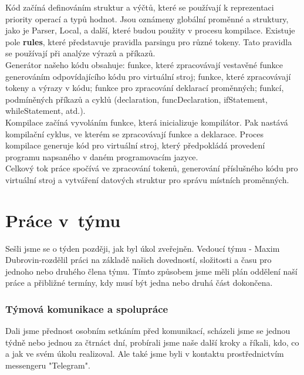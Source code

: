 \documentclass[a4paper, 11pt]{article}
\begin{document}
        Kód začíná definováním struktur a výčtů, které se používají k reprezentaci priority operací a typů hodnot.
        Jsou oznámeny globální proměnné a struktury, jako je Parser, Local, a další, které budou použity v procesu kompilace. Existuje pole \textbf{rules}, které představuje pravidla parsingu pro různé tokeny. Tato pravidla se používají při analýze výrazů a příkazů.\\
        Generátor našeho kódu obsahuje: funkce, které zpracovávají vestavěné funkce generováním odpovídajícího kódu pro virtuální stroj; funkce, které zpracovávají tokeny a výrazy v kódu; funkce pro zpracování deklarací proměnných; funkcí, podmíněných příkazů a cyklů (declaration, funcDeclaration, ifStatement, whileStatement, atd.).\\
        Kompilace začíná vyvoláním funkce, která inicializuje kompilátor. Pak nastává kompilační cyklus, ve kterém se zpracovávají funkce a deklarace.
        Proces kompilace generuje kód pro virtuální stroj, který předpokládá provedení programu napsaného v daném programovacím jazyce.\\

        
        Celkový tok práce spočívá ve zpracování tokenů, generování příslušného kódu pro virtuální stroj a vytváření datových struktur pro správu místních proměnných.


	\section{Práce v~týmu}

        Sešli jsme se o týden později, jak byl úkol zveřejněn. Vedoucí týmu - Maxim Dubrovin-rozdělil práci na základě našich dovedností, složitosti a času pro jednoho nebo druhého člena týmu. Tímto způsobem jsme měli plán oddělení naší práce a přibližné termíny, kdy musí být jedna nebo druhá část dokončena.

	\subsubsection{Týmová komunikace a spolupráce}

        Dali jsme přednost osobním setkáním před komunikací, scházeli jsme se jednou týdně nebo jednou za čtrnáct dní, probírali jsme naše další kroky a říkali, kdo, co a jak ve svém úkolu realizoval. Ale také jsme byli v kontaktu prostřednictvím messengeru "Telegram".
        \\
        
\end{document}

